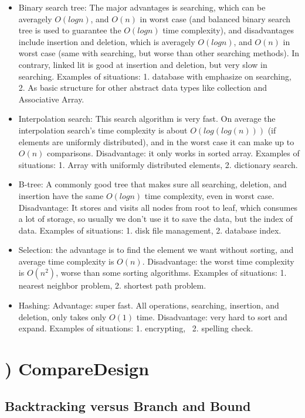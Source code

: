 \documentclass[natbib,12pt]{article}
\begin{document}
\begin{itemize}
	\item Binary search tree: The major advantages is searching, which can be averagely $O(log n)$, and $O(n)$ in worst case (and balanced binary search tree is used to guarantee the $O(log n)$ time complexity), and disadvantages include insertion and deletion, which is averagely $O(log n)$, and $O(n)$ in worst case (same with searching, but worse than other searching methods).  In contrary, linked lit is good at insertion and deletion, but very slow in searching. Examples of situations: 1. database with emphasize on searching, 2. As basic structure for other abstract data types like collection and Associative Array.
	\item Interpolation search: This search algorithm is very fast. On average the interpolation search's time complexity is about $O(log(log(n)))$ (if elements are uniformly distributed), and in the worst case it can make up to $O(n)$ comparisons. Disadvantage: it only works in sorted array. Examples of situations: 1. Array with uniformly distributed elements, 2. dictionary search.
	\item B-tree: A commonly good tree that makes sure all searching, deletion, and insertion have the same $O(logn)$ time complexity, even in worst case. Disadvantage: It stores and visits all nodes from root to leaf, which consumes a lot of storage, so usually we don't use it to save the data, but the index of data. Examples of situations: 1. disk file management, 2. database index.
	\item Selection: the advantage is to find the element we want without sorting, and average time complexity is $O(n)$. Disadvantage: the worst time complexity is $O(n^2)$, worse than some sorting algorithms. Examples of situations: 1. nearest neighbor problem, 2. shortest path problem.
	\item Hashing: Advantage: super fast. All operations, searching, insertion, and deletion, only takes only $O(1)$ time. Disadvantage: very hard to sort and expand. Examples of situations: 1. encrypting,  2. spelling check.
\end{itemize}


\newpage
\section{) CompareDesign}

\subsection{Backtracking versus Branch and Bound}
\end{document}
